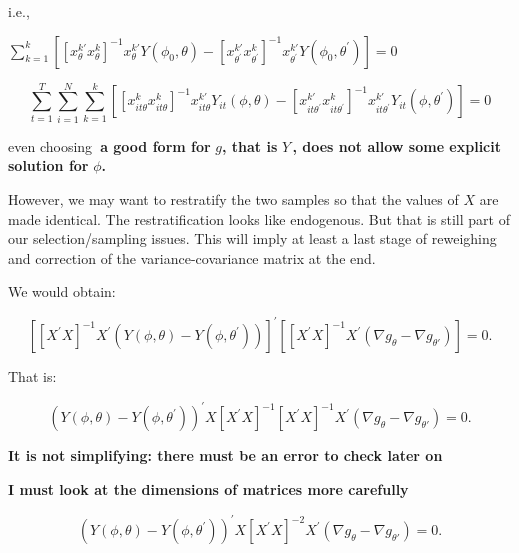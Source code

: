 \documentclass[a4paper,notitlepage,thmsb,11pt]{article}
\begin{document}
i.e.,

$\sum\limits_{k=1}^{k}\left[ \left[ x_{\theta }^{k\prime }x_{\theta }^{k}%
\right] ^{-1}x_{\theta }^{k\prime }Y(\phi _{0},\theta )-\left[ x_{\theta
^{\prime }}^{k\prime }x_{\theta ^{\prime }}^{k}\right] ^{-1}x_{\theta
^{\prime }}^{k\prime }Y(\phi _{0},\theta ^{\prime })\right] =0$

\begin{equation*}
\sum_{t=1}^{T}\sum_{i=1}^{N}\sum\limits_{k=1}^{k}\left[ \left[ x_{it\theta
}^{k}x_{it\theta }^{k}\right] ^{-1}x_{it\theta }^{k\prime }Y_{it}(\phi
,\theta )-\left[ x_{it\theta ^{\prime }}^{k\prime }x_{it\theta ^{\prime
}}^{k}\right] ^{-1}x_{it\theta ^{\prime }}^{k\prime }Y_{it}(\phi ,\theta
^{\prime })\right] =0
\end{equation*}

even choosing\textbf{\ a good form for }$g$\textbf{, that is }$Y\,$\textbf{,
does not allow some explicit solution for }$\phi $\textbf{.}

\bigskip However, we may want to restratify the two samples so that the
values of $X$ are made identical. The restratification looks like
endogenous. But that is still part of our selection/sampling issues. This
will imply at least a last stage of reweighing and correction of the
variance-covariance matrix at the end.

We would obtain:

\begin{equation}
\left[ \left[ X^{\prime }X\right] ^{-1}X^{\prime }\left( Y(\phi ,\theta
)-Y(\phi ,\theta ^{\prime })\right) \right] ^{\prime }\left[ \left[
X^{\prime }X\right] ^{-1}X^{\prime }\left( \nabla g_{\theta }-\nabla
g_{\theta \prime }\right) \right] =0.
\end{equation}

\bigskip 

That is:

\begin{equation}
\left( Y(\phi ,\theta )-Y(\phi ,\theta ^{\prime })\right) ^{\prime }X\left[
X^{\prime }X\right] ^{-1}\left[ X^{\prime }X\right] ^{-1}X^{\prime }\left(
\nabla g_{\theta }-\nabla g_{\theta \prime }\right) =0.
\end{equation}%
\bigskip 

\textbf{\bigskip It is not simplifying: there must be an error to check
later on}

\textbf{I must look at the dimensions of matrices more carefully}

\textbf{\bigskip }%
\begin{equation}
\left( Y(\phi ,\theta )-Y(\phi ,\theta ^{\prime })\right) ^{\prime }X\left[
X^{\prime }X\right] ^{-2}X^{\prime }\left( \nabla g_{\theta }-\nabla
g_{\theta \prime }\right) =0.
\end{equation}
\end{document}
